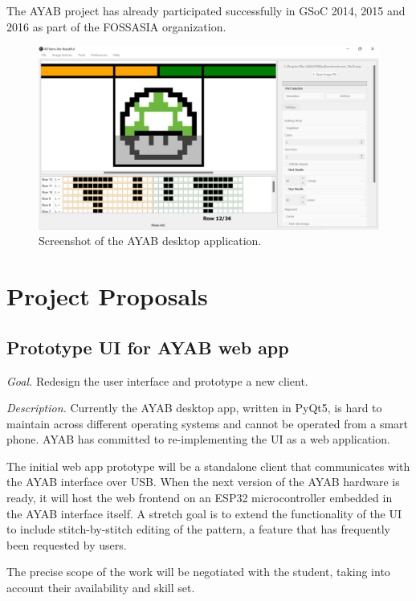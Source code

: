 \documentclass{article}
\begin{document}
The AYAB project has already participated successfully in GSoC 2014, 2015 and 2016 as part of the FOSSASIA organization.

\newpage
\begin{figure}
    \centering
    \includegraphics[width=\textwidth]{ayab-app-screenshot.png}
    \caption{Screenshot of the AYAB desktop application.}
    \label{fig:1}
\end{figure}


\section{Project Proposals}

\subsection{Prototype UI for AYAB web app}

\textit{Goal.} Redesign the user interface and prototype a new client.

\textit{Description.} Currently the AYAB desktop app, written in PyQt5, is hard to maintain across different operating systems and cannot be operated from a smart phone. AYAB has committed to re-implementing the UI as a web application.

The initial web app prototype will be a standalone client that communicates with the AYAB interface over USB. When the next version of the AYAB hardware is ready, it will host the web frontend on an ESP32 microcontroller embedded in the AYAB interface itself. A stretch goal is to extend the functionality of the UI to include stitch-by-stitch editing of the pattern, a feature that has frequently been requested by users.

The precise scope of the work will be negotiated with the student, taking into account their availability and skill set.
\end{document}
